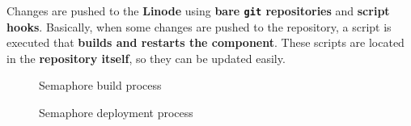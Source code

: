 \documentclass[a4paper,11pt]{article}
\begin{document}
Changes are pushed to the \textbf{Linode} using \textbf{bare \texttt{git} repositories} and \textbf{script hooks}. Basically,
when some changes are pushed to the repository, a script is executed that \textbf{builds and restarts the component}.
These scripts are located in the \textbf{repository itself}, so they can be updated easily.
\begin{figure}[H]
\noindent{}
\caption{Semaphore build process}
\label{build_process}
\end{figure}
\begin{figure}[H]
\noindent{}
\caption{Semaphore deployment process}
\label{deployment_process}
\end{figure}
\clearpage
\end{document}
